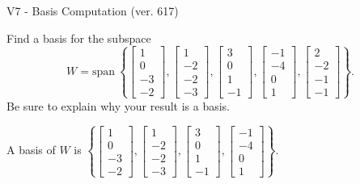 \begin{exercise}
  \begin{exerciseTitle}V7 - Basis Computation (ver. 617)\end{exerciseTitle}
  \begin{exerciseStatement}
    Find a basis for the subspace 
\[W=\mathrm{span}\ \left\{\left[\begin{array}{r}
1 \\
0 \\
-3 \\
-2
\end{array}\right] , \left[\begin{array}{r}
1 \\
-2 \\
-2 \\
-3
\end{array}\right] , \left[\begin{array}{r}
3 \\
0 \\
1 \\
-1
\end{array}\right] , \left[\begin{array}{r}
-1 \\
-4 \\
0 \\
1
\end{array}\right] , \left[\begin{array}{r}
2 \\
-2 \\
-1 \\
-1
\end{array}\right]\right\}.\]
 Be sure to explain why your result is a basis.


  \end{exerciseStatement}
  \begin{exerciseAnswer}
   A basis of \(W\) is  \(\left\{\left[\begin{array}{r}
1 \\
0 \\
-3 \\
-2
\end{array}\right] , \left[\begin{array}{r}
1 \\
-2 \\
-2 \\
-3
\end{array}\right] , \left[\begin{array}{r}
3 \\
0 \\
1 \\
-1
\end{array}\right] , \left[\begin{array}{r}
-1 \\
-4 \\
0 \\
1
\end{array}\right]\right\}\).
  


  \end{exerciseAnswer}
\end{exercise}